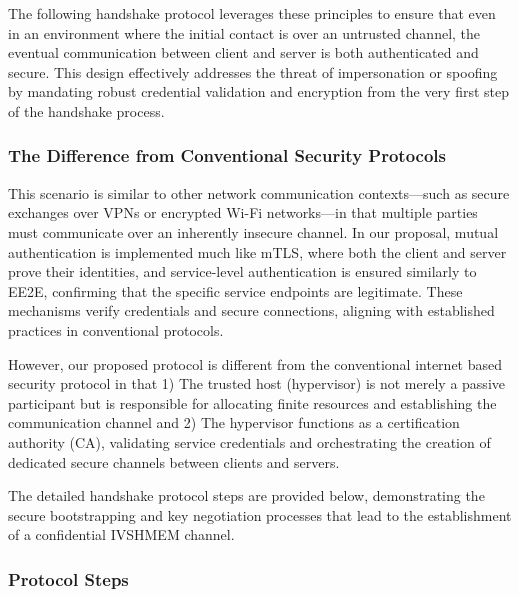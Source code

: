 \documentclass[letterpaper,twocolumn,10pt]{article}
\begin{document}
The following handshake protocol leverages these principles to ensure that even in an environment where the initial contact is over an untrusted channel, the eventual communication between client and server is both authenticated and secure. This design effectively addresses the threat of impersonation or spoofing by mandating robust credential validation and encryption from the very first step of the handshake process.





\subsubsection{The Difference from Conventional Security Protocols}

This scenario is similar to other network communication contexts—such as secure exchanges over VPNs or encrypted Wi-Fi networks—in that multiple parties must communicate over an inherently insecure channel. In our proposal, mutual authentication is implemented much like mTLS, where both the client and server prove their identities, and service-level authentication is ensured similarly to EE2E, confirming that the specific service endpoints are legitimate. These mechanisms verify credentials and secure connections, aligning with established practices in conventional protocols.

However, our proposed protocol is different from the conventional internet based security protocol in that 1) The trusted host (hypervisor) is not merely a passive participant but is responsible for allocating finite resources and establishing the communication channel  and 2) The hypervisor functions as a certification authority (CA), validating service credentials and orchestrating the creation of dedicated secure channels between clients and servers. 

The detailed handshake protocol steps are provided below, demonstrating the secure bootstrapping and key negotiation processes that lead to the establishment of a confidential IVSHMEM channel.






\subsubsection{Protocol Steps}
\end{document}
